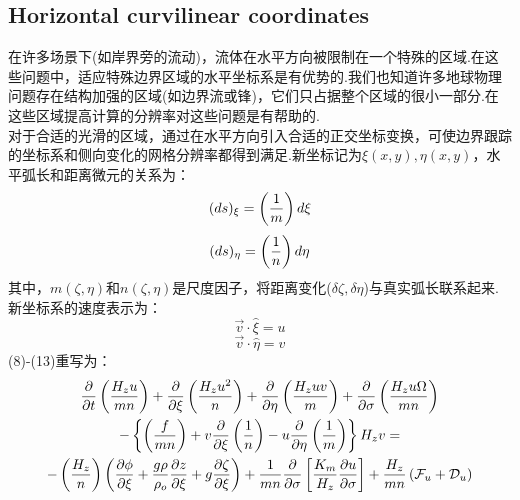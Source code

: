 \documentclass[a3paper,12pt]{article}
\begin{document}
    \subsection{Horizontal curvilinear coordinates}
    在许多场景下(如岸界旁的流动)，流体在水平方向被限制在一个特殊的区域.在这些问题中，适应特殊边界区域的水平坐标系是有优势的.我们也知道许多地球物理问题存在结构加强的区域(如边界流或锋)，它们只占据整个区域的很小一部分.在这些区域提高计算的分辨率对这些问题是有帮助的.\\
    对于合适的光滑的区域，通过在水平方向引入合适的正交坐标变换，可使边界跟踪的坐标系和侧向变化的网格分辨率都得到满足.新坐标记为$\xi(x,y),\eta(x,y)$，水平弧长和距离微元的关系为：
    \begin{equation}
        (ds)_{\xi}=\left({1\over m}\right)d\xi        
    \end{equation}
    \begin{equation}
        (ds)_{\eta}=\left({1\over n}\right)d\eta
    \end{equation}
    其中，$m(\zeta,\eta)$和$n(\zeta,\eta)$是尺度因子，将距离变化($\delta\zeta,\delta\eta$)与真实弧长联系起来.新坐标系的速度表示为：
    \begin{equation}
        \vec{v}\cdot\hat{\xi}=u
    \end{equation}
    \begin{equation}
        \vec{v}\cdot\hat{\eta}=v
    \end{equation}
    (8)-(13)重写为：
    {\samepage
    \begin{multline}
    \frac{\partial}{\partial t} \left( \frac{H_z u}{mn} \right) + \frac
    {\partial}{\partial \xi} \left( \frac{H_z u^2}{n} \right ) + \frac
    {\partial}{\partial \eta} \left( \frac{H_z uv}{m} \right) + \frac
    {\partial}{\partial \sigma} \left( \frac{H_z u\Omega}{mn} \right)
    \\
    - \left\{\left(\frac{f}{mn} \right) + v \frac{\partial}{\partial \xi}
    \left( \frac{1}{n} \right) - u \frac{\partial}{\partial \eta} \left(
    \frac{1}{m} \right) \right\} H_z v =
    \\
    -\left( \frac{H_z }{n} \right )
    \left( \frac{\partial \phi}{\partial \xi} +
    \frac{g \rho}{\rho_o} \frac{\partial z}{\partial \xi} +
    g \frac{\partial \zeta}{\partial \xi} \right) +
    \frac{ 1}{mn} \frac{\partial}{\partial \sigma}
    \left[ \frac{K_m}{H_z} \frac{\partial u}{\partial \sigma} \right] +
    \frac{ H_z}{mn}
    \left( {\cal F}_u + {\cal D}_u \right)
    \label{st13}
    \end{multline}
    }
\end{document}

